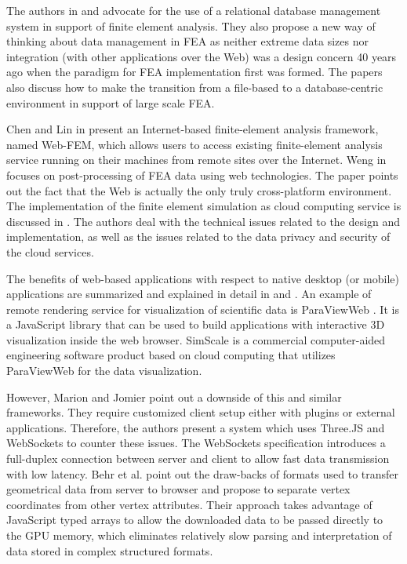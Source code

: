 The authors in \cite{Heber2007I} and \cite{Heber2007II} advocate for the use of a relational database management system in support of finite element analysis. They also propose a new way of thinking about data management in FEA as neither extreme data sizes nor integration (with other applications over the Web) was a design concern 40 years ago when the paradigm for FEA implementation first was formed. The papers also discuss how to make the transition from a file-based to a database-centric environment in support of large scale FEA.

Chen and Lin in \cite{Chen2008} present an Internet-based finite-element analysis framework, named Web-FEM, which allows users to access existing finite-element analysis service running on their machines from remote sites over the Internet. Weng in \cite{Weng2011} focuses on post-processing of FEA data using web technologies. The paper points out the fact that the Web is actually the only truly cross-platform environment. The implementation of the finite element simulation as cloud computing service is discussed in \cite{Ari2013}. The authors deal with the technical issues related to the design and implementation, as well as the issues related to the data privacy and security of the cloud services.

The benefits of web-based applications with respect to native desktop (or mobile) applications are summarized and explained in detail in \cite{Mouton2011} and \cite{Charland2011}. An example of remote rendering service for visualization of scientific data is ParaViewWeb \cite{Jourdain2011}. It is a JavaScript library that can be used to build applications with interactive 3D visualization inside the web browser. SimScale \cite{SimScale} is a commercial computer-aided engineering software product based on cloud computing that utilizes ParaViewWeb for the data visualization.

However, Marion and Jomier point out \cite{Marion2012} a downside of this and similar frameworks. They require customized client setup either with plugins or external applications. Therefore, the authors present a system which uses Three.JS and WebSockets to counter these issues. The WebSockets specification \cite{WebSockets} introduces a full-duplex connection between server and client to allow fast data transmission with low latency. Behr et al. \cite{Behr2012} point out the draw-backs of formats used to transfer geometrical data from server to browser and propose to separate vertex coordinates from other vertex attributes. Their approach takes advantage of JavaScript typed arrays to allow the downloaded data to be passed directly to the GPU memory, which eliminates relatively slow parsing and interpretation of data stored in complex structured formats.
